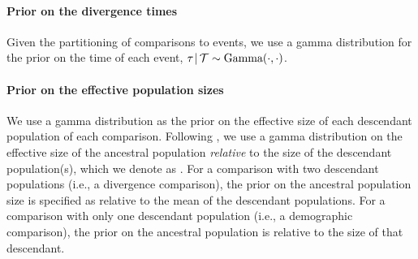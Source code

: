 \paragraph{Prior on the divergence times}
Given the partitioning of comparisons to events, we use a gamma
distribution for the prior on the time of each event,
$\tau_{} \,|\, \mathcal{T} \sim \textrm{Gamma}(\cdot, \cdot)$.

\paragraph{Prior on the effective population sizes}
We use a gamma distribution as the prior on
the effective size of each descendant population of each comparison.
Following \citet{Oaks2018ecoevolity},
we use a gamma distribution on the effective size of the ancestral population
\emph{relative} to the size of the descendant population(s), which we
denote as \rootrelativepopsize.
For a comparison with two descendant populations (i.e., a divergence comparison),
the prior on the ancestral population size is specified as relative to the mean
of the descendant populations.
For a comparison with only one descendant population (i.e., a demographic
comparison), the prior on the ancestral population is relative to the size of
that descendant.

